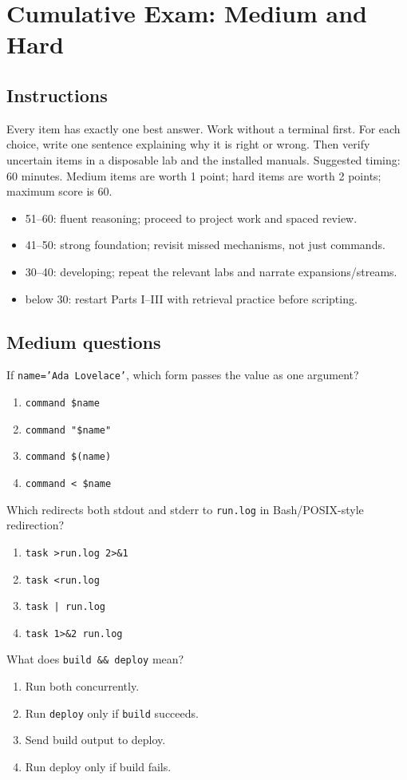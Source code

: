 \documentclass[11pt,oneside,openany]{book}
\newcommand{\fourchoices}[4]{%
  \begin{enumerate}[label=\Alph*),leftmargin=2em,itemsep=0.25em]
    \item #1
    \item #2
    \item #3
    \item #4
  \end{enumerate}}
\begin{document}
\chapter{Cumulative Exam: Medium and Hard}
\section{Instructions}
Every item has exactly one best answer. Work without a terminal first. For each choice, write one sentence explaining why it is right or wrong. Then verify uncertain items in a disposable lab and the installed manuals. Suggested timing: 60 minutes. Medium items are worth 1 point; hard items are worth 2 points; maximum score is 60.

\begin{tcolorbox}[colback=Paper,colframe=Blue,title={Interpretation},fonttitle=\bfseries]
\begin{itemize}
  \item 51--60: fluent reasoning; proceed to project work and spaced review.
  \item 41--50: strong foundation; revisit missed mechanisms, not just commands.
  \item 30--40: developing; repeat the relevant labs and narrate expansions/streams.
  \item below 30: restart Parts I--III with retrieval practice before scripting.
\end{itemize}
\end{tcolorbox}

\section{Medium questions}
\begin{questionbox}[title={Medium 1 -- Quoting}]
If \texttt{name='Ada Lovelace'}, which form passes the value as one argument?
\fourchoices{\texttt{command \$name}}{\texttt{command "\$name"}}{\texttt{command \$(name)}}{\texttt{command < \$name}}
\end{questionbox}

\begin{questionbox}[title={Medium 2 -- Both output streams}]
Which redirects both stdout and stderr to \texttt{run.log} in Bash/POSIX-style redirection?
\fourchoices{\texttt{task >run.log 2>\&1}}{\texttt{task <run.log}}{\texttt{task | run.log}}{\texttt{task 1>\&2 run.log}}
\end{questionbox}

\begin{questionbox}[title={Medium 3 -- Conditional execution}]
What does \texttt{build \&\& deploy} mean?
\fourchoices{Run both concurrently.}{Run \texttt{deploy} only if \texttt{build} succeeds.}{Send build output to deploy.}{Run deploy only if build fails.}
\end{questionbox}
\end{document}
